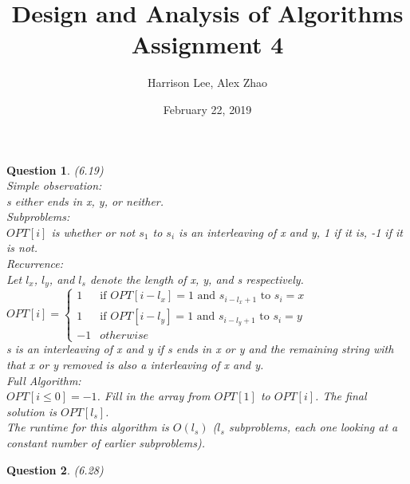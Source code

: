 \documentclass[11pt, oneside]{article}   	%
\title {Design and Analysis of Algorithms Assignment 4}
\author{Harrison Lee, Alex Zhao}
\date{February 22, 2019}
\newtheorem{Question}{Question}
\begin{document}
\maketitle

\begin{Question} (6.19) \smallskip \\
Simple observation:  \\
s either ends in x, y, or neither. \bigskip \\
Subproblems: \\
$OPT[i]$ is whether or not $s_1$ to $s_i$ is an interleaving of x and y, 1 if it is, -1 if it is not. \bigskip \\
Recurrence: \\
Let $l_x$, $l_y$, and $l_s$ denote the length of x, y, and s respectively. \smallskip \\
$OPT[i]=
\begin{cases}
    1 &\text{if } OPT[i-l_x]=1 \text{ and } s_{i-l_x+1} \text{ to } s_i=x\\
    1 &\text{if } OPT[i-l_y]=1 \text{ and } s_{i-l_y+1} \text{ to } s_i=y\\
    -1 & otherwise
\end{cases}
$\smallskip \\
s is an interleaving of x and y if s ends in x or y and the remaining string with that x or y removed is also a interleaving of x and y.\bigskip \\
Full Algorithm:\\
$OPT[i\leq 0]=-1$. Fill in the array from $OPT[1]$ to $OPT[i]$. The final solution is $OPT[l_s]$. \smallskip \\
The runtime for this algorithm is $O(l_s)$ ($l_s$ subproblems, each one looking at a constant number of earlier subproblems). 
\end{Question}

\newpage
\linespread{1.1}
\begin{Question} (6.28) 
\end{Question}
\end{document}
